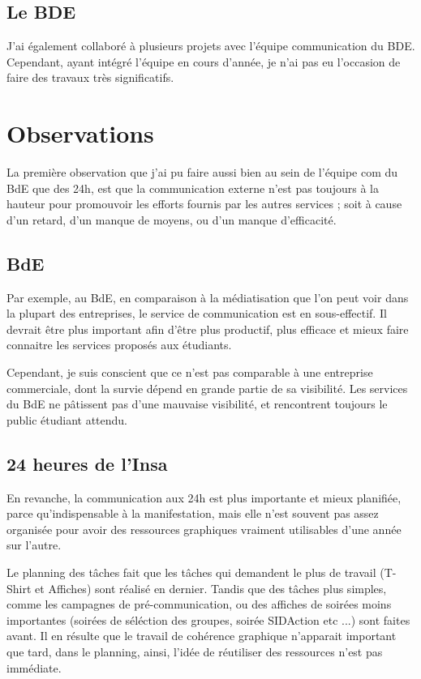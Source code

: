     \subsection{Le BDE}
    
        J'ai également collaboré à plusieurs projets avec l'équipe communication du BDE.
        Cependant, ayant intégré l'équipe en cours d'année, je n'ai pas eu l'occasion de faire des travaux très significatifs.

\section{Observations}

    La première observation que j'ai pu faire aussi bien au sein de l'équipe com du BdE que des 24h, est que la communication externe n'est pas toujours à la hauteur pour promouvoir les efforts fournis par les autres services ; soit à cause d'un retard, d'un manque de moyens, ou d'un manque d'efficacité.

    \subsection{BdE}

        Par exemple, au BdE, en comparaison à la médiatisation que l'on peut voir dans la plupart des entreprises, le service de communication est en sous-effectif. Il devrait être plus important afin d'être plus productif, plus efficace et mieux faire connaitre les services proposés aux étudiants.

        Cependant, je suis conscient que ce n'est pas comparable à une entreprise commerciale, dont la survie dépend en grande partie de sa visibilité.
        Les services du BdE ne pâtissent pas d'une mauvaise visibilité, et rencontrent toujours le public étudiant attendu.
    
    \subsection{24 heures de l'Insa}
        
        En revanche, la communication aux 24h est plus importante et mieux planifiée, parce qu'indispensable à la manifestation, mais elle n'est souvent pas assez organisée pour avoir des ressources graphiques vraiment utilisables d'une année sur l'autre.
        
        Le planning des tâches fait que les tâches qui demandent le plus de travail (T-Shirt et Affiches) sont réalisé en dernier.
        Tandis que des tâches plus simples, comme les campagnes de pré-communication, ou des affiches de soirées moins importantes (soirées de séléction des groupes, soirée SIDAction etc ...) sont faites avant.
        Il en résulte que le travail de cohérence graphique n'apparait important que tard, dans le planning, ainsi, l'idée de réutiliser des ressources n'est pas immédiate.

